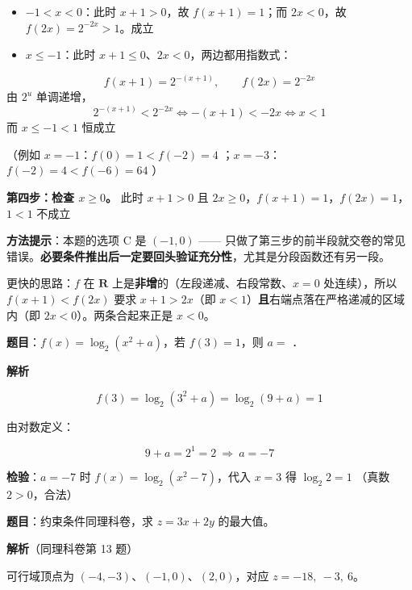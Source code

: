 \begin{itemize}
\item \textbf{$-1<x<0$}：此时 $x+1>0$，故 $f(x+1)=1$；而 $2x<0$，故 $f(2x)=2^{-2x}>1$。成立 
\item \textbf{$x\le-1$}：此时 $x+1\le0$、$2x<0$，两边都用指数式：
\end{itemize}
\[f(x+1)=2^{-(x+1)},\qquad f(2x)=2^{-2x}\]
  由 $2^{u}$ 单调递增，
\[2^{-(x+1)}<2^{-2x}\iff-(x+1)<-2x\iff x<1\]
  而 $x\le-1<1$ 恒成立 

（例如 $x=-1$：$f(0)=1<f(-2)=4$ ；$x=-3$：$f(-2)=4<f(-6)=64$ ）

\textbf{第四步：检查 $x\ge0$。} 此时 $x+1>0$ 且 $2x\ge0$，$f(x+1)=1$，$f(2x)=1$，$1<1$ 不成立 


\begin{gktip}
\textbf{方法提示}：本题的选项 C 是 $(-1,0)$ —— 只做了第三步的前半段就交卷的常见错误。\textbf{必要条件推出后一定要回头验证充分性}，尤其是分段函数还有另一段。

更快的思路：$f$ 在 $\mathbf R$ 上是\textbf{非增}的（左段递减、右段常数、$x=0$ 处连续），所以 $f(x+1)<f(2x)$ 要求 $x+1>2x$（即 $x<1$）\textbf{且}右端点落在严格递减的区域内（即 $2x<0$）。两条合起来正是 $x<0$。
\end{gktip}

\par\medskip



\textbf{题目}：$f(x)=\log_2\left(x^{2}+a\right)$，若 $f(3)=1$，则 $a=$ \gkblank{}．

\textbf{解析}

\[f(3)=\log_2\left(3^{2}+a\right)=\log_2(9+a)=1\]

由对数定义：

\[9+a=2^{1}=2\ \Longrightarrow\ a=-7\]

\textbf{检验}：$a=-7$ 时 $f(x)=\log_2\left(x^{2}-7\right)$，代入 $x=3$ 得 $\log_2 2=1$ （真数 $2>0$，合法）


\par\medskip


\textbf{题目}：约束条件同理科卷，求 $z=3x+2y$ 的最大值。

\textbf{解析}（同理科卷第 13 题）

可行域顶点为 $(-4,-3)$、$(-1,0)$、$(2,0)$，对应 $z=-18,\ -3,\ 6$。

